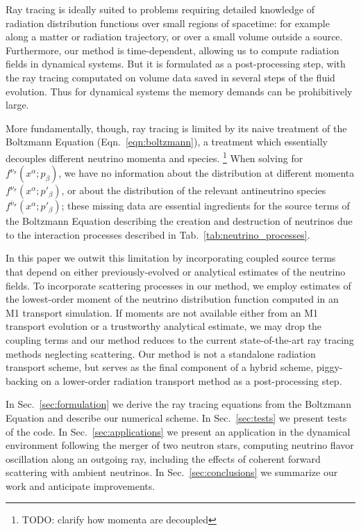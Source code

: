 \documentclass[aps,floatfix,prd,superscriptaddress,twocolumn]{revtex4-1}
\begin{document}
Ray tracing is ideally suited to problems requiring detailed knowledge of
radiation distribution functions over small regions of spacetime:
for example along a matter or radiation trajectory,
or over a small volume outside a source.
Furthermore, our method is time-dependent, allowing us to compute radiation
fields in dynamical systems. But it is formulated as a post-processing step,
with the ray tracing computated on volume data saved in several steps
of the fluid evolution.
Thus for dynamical systems the memory demands can be prohibitively large.

More fundamentally, though, ray tracing is limited by its naive
treatment of the Boltzmann Equation (Eqn.~\ref{eqn:boltzmann}),
a treatment which essentially decouples different neutrino momenta and species.
\footnote{TODO: clarify how momenta are decoupled}
When solving for $f^{\nu_\sigma}(x^\alpha;p_\beta)$,
we have no information about the distribution at different momenta
$f^{\nu_\sigma}(x^\alpha;p'_\beta)$,
or about the distribution of the relevant antineutrino species
$f^{\bar{\nu}_\sigma}(x^\alpha;p'_\beta)$;
these missing data are essential ingredients
for the source terms of the Boltzmann Equation describing the creation and
destruction of neutrinos due to the interaction processes described in
Tab.~\ref{tab:neutrino_processes}.

In this paper we outwit this limitation by incorporating coupled source terms
that depend on either previously-evolved or analytical
estimates of the neutrino fields.
To incorporate scattering processes in our method, we employ estimates of the
lowest-order moment of the neutrino distribution function
computed in an M1 transport simulation.
If moments are not available either from
an M1 transport evolution or a trustworthy analytical estimate,
we may drop the coupling terms and our method reduces to the current
state-of-the-art ray tracing methods neglecting scattering.
Our method is not a standalone radiation transport scheme,
but serves as the final component of a hybrid scheme,
piggy-backing on a lower-order radiation transport method as a
post-processing step.

In Sec.~\ref{sec:formulation} we derive the ray tracing equations from the
Boltzmann Equation and describe our numerical scheme.
In Sec.~\ref{sec:tests} we present tests of the code.
In Sec.~\ref{sec:applications} we present an application
in the dynamical environment following the merger of two neutron stars,
computing neutrino flavor oscillation along an outgoing ray,
including the effects of coherent forward scattering with ambient neutrinos.
In Sec.~\ref{sec:conclusions} we summarize our work and anticipate improvements.
\end{document}
